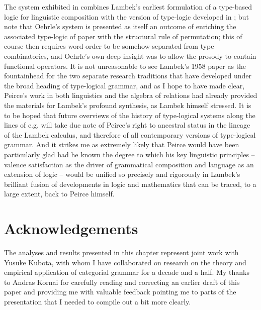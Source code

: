 \documentclass[output=paper,colorlinks,citecolor=brown]{langscibook}
\begin{document}
The system exhibited in  combines Lambek's earliest formulation
of a type-based logic for linguistic composition with the version of
type-logic developed in \citet{oehrle1994}; but note that Oehrle's system is
presented as itself an outcome of enriching the associated type-logic
of  paper with the structural rule of permutation; this
of course then requires word order to be somehow separated from type
combinatorics, and Oehrle's own deep insight was to allow the prosody
to contain functional operators. It is not unreasonable to see
Lambek's 1958 paper as the fountainhead for the two separate research
traditions that have developed under the broad heading of type-logical
grammar, and as I hope to have made clear, Peirce's work in both
linguistics and the algebra of relations had already provided the
materials for Lambek's profound synthesis, as Lambek himself stressed.
It is to be hoped that future overviews of the history of type-logical
systems along the lines of e.g. \citet{moortgat2010} will take due note of Peirce's right to
ancestral status in the lineage of the Lambek calculus, and therefore
of all contemporary versions of type-logical grammar. And it strikes
me as extremely likely that Peirce would have been
particularly glad had he known the degree to which his key
linguistic principles -- valence satisfaction as the driver of
grammatical composition and language as an extension of logic -- would
be unified so precisely and rigorously in Lambek's brilliant fusion
of developments in logic and mathematics that can be traced, to a large
extent, back to Peirce himself.


\section*{Acknowledgements}
The analyses and results
presented in this chapter represent joint work with Yusuke Kubota, with whom I
have collaborated on research on the theory and empirical application of
categorial grammar for a decade and a half. My thanks to Andras Kornai
for carefully reading and correcting an earlier draft of this paper
and providing me with valuable feedback pointing me to parts of
the presentation that I needed to compile out a bit more clearly.

{\sloppy\printbibliography[heading=subbibliography,notkeyword=this]}
\end{document}
